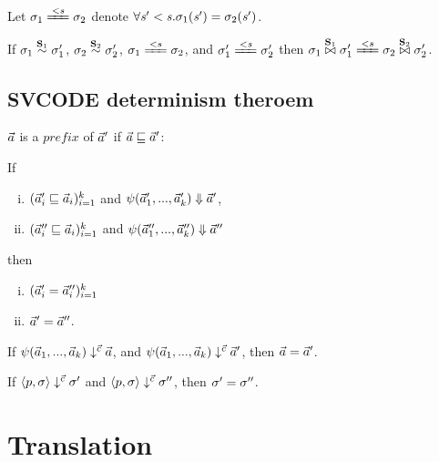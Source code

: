 Let $\sgm_1 \ConEq{\s} \sgm_2$ denote $\forall \mathit{s}' < \mathit{s}. \sigma_1(\mathit{s}') = \sigma_2(\mathit{s}')$. 
	
\begin{lem}\label{lem-join2}
	If $\sigma_1 \stackrel{\mathbf{S}_1}{\sim} \sigma'_1$, $\sigma_2 \stackrel{\mathbf{S}_2}{\sim} \sigma'_2$, $\sgm_1 \ConEq{s} \sgm_2$,
	and $\sgm'_1 \ConEq{\s} \sgm_2'$  
	then $\sgm_1 \x{\S_1} \sgm_1' \ConEq{s} \sgm_2 \x{\S_2} \sgm'_2$. 
\end{lem}

\subsection{SVCODE determinism theroem}

\begin{defi}
	$\vec a$ is a $prefix$ of $\vec a'$ if $\vec a \sqsubseteq \vec a'$: \\
	\PT{\Axiom{\emptyv \prefix \a }}
	
\end{defi}


\begin{lem}
	If
	\begin{enumerate}[(i)]
		\item $(\vec a_i' \sqsubseteq  \vec a_i)^k_{i=1}$ and ${\psi}(\vec a_1',...,\vec a_k') \Downarrow \vec a'$, 
		\item $(\vec a_i'' \sqsubseteq \vec a_i)^k_{i=1}$ and
		${\psi}(\vec a_1'',...,\vec a_k'') \Downarrow \vec a''$
	\end{enumerate} 
	then \begin{enumerate}[(i)]
		\item $(\vec a_i' = \vec a_i'')^k_{i=1}$ 
		\item $\vec a' = \vec a''$.
	\end{enumerate}
\end{lem}

\begin{lem} \label{thm-lcall-determ}
	If $\psi(\vec a_1,...,\vec a_{k}) \downarrow^{\vec c} \vec a$,
	and $\psi(\vec a_1,...,\vec a_{k}) \downarrow^{\vec c} \vec a'$,
	then $\vec a = \vec a'$.
\end{lem}

\begin{thm} \label{thm-svcode-determ}
	If $\left\langle p,\sigma \right\rangle \downarrow^{\vec c} \sigma'$ and $\left\langle p,\sigma \right\rangle \downarrow^{\vec c} \sigma''$, 
	then $\sigma' = \sigma''$.
\end{thm}


\section{Translation}



